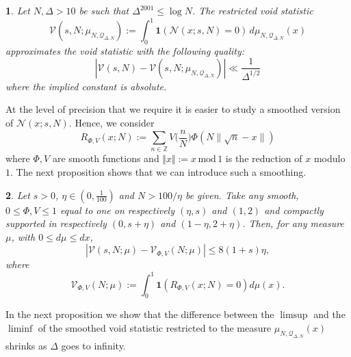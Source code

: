 \documentclass[12pt,reqno]{amsart}
\theoremstyle{plain}
\numberwithin{equation}{section}
\numberwithin{figure}{section}
\theoremstyle{plain}
\newtheorem{prop}{\protect\propositionname}
\theoremstyle{definition}
\theoremstyle{remark}
\newcommand{\mmod}{\,\mathrm{mod}\,}
\providecommand{\propositionname}{Proposition}
\begin{document}
    
    \begin{prop} \label{prop1}
      Let $N, \Delta > 10$
      be such that $\Delta^{2001} \leq \log N$. 
 The restricted void statistic
  $$
  \mathcal{V}(s,N; \mu_{N, \mathcal{Q}_{\Delta, N}})
   := \int_{0}^{1} 
  \mathbf{1} ( \mathcal{N}(x; s, N) = 0 ) 
  \, d\mu_{ N, \mathcal{Q}_{\Delta, N}}(x)
  $$
  approximates the void statistic
  with the following quality:
  $$
  | 
  \mathcal{V}(s,N)
  - 
 \mathcal{V}(s,N; \mu_{N, \mathcal{Q}_{\Delta, N}})
  | \ll \frac{1}{\Delta^{1/2}}
    $$
where the 
implied constant is absolute. 
\end{prop}
At the level of precision that we require it is easier to study a smoothed version of $\mathcal{N}(x; s, N)$. 
Hence, we consider
$$
R_{\Phi, V}(x; N) := \sum_{n \in \mathbb{Z}} V \Big ( \frac{n}{N} \Big ) \Phi ( N \| \sqrt{n} - x \| )
$$
where $\Phi,V$ are smooth functions
and $\Vert x \Vert := x \mmod 1$ is the reduction of $x$ modulo $1$. The next proposition shows that we can introduce such a smoothing.

\begin{prop} \label{prop:smoothingprop}
  Let $s > 0$, $\eta \in (0, \tfrac{1}{100})$ and $N > 100 / \eta$ be given.
  Take any smooth, 
  $0 \leq \Phi, V \leq 1$
  equal to one on respectively $(\eta,s)$ and $(1,2)$ and compactly supported in respectively $(0, s + \eta)$ and $(1 - \eta, 2 + \eta)$.
  Then, for any measure $\mu$, with $0 \leq d \mu \leq d x$, 
  $$
  |\mathcal{V}(s, N; \mu) - \mathcal{V}_{\Phi, V}(N; \mu)| \leq 8 (1 + s)\eta,
  $$
  where
  $$
  \mathcal{V}_{\Phi, V}(N ; \mu) := \int_{0}^{1} \mathbf{1} (R_{\Phi, V}(x; N) = 0) d \mu(x). 
  $$
\end{prop}

In the next proposition we show that the difference between the $\limsup$ and the $\liminf$ of the smoothed void statistic restricted to the measure $\mu_{ N, \mathcal{Q}_{\Delta, N}}(x)$ shrinks as $\Delta$ goes to infinity. 
\end{document}
